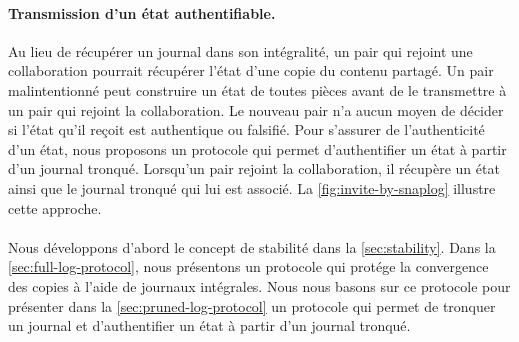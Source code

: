 \paragraph{Transmission d'un état authentifiable.} Au lieu de récupérer un journal dans son intégralité, un pair qui rejoint une collaboration pourrait récupérer l'état d'une copie du contenu partagé.
Un pair malintentionné peut construire un état de toutes pièces avant de le transmettre à un pair qui rejoint la collaboration.
Le nouveau pair n'a aucun moyen de décider si l'état qu'il reçoit est authentique ou falsifié.
Pour s'assurer de l'authenticité d'un état, nous proposons un protocole qui permet d'authentifier un état à partir d'un journal tronqué.
Lorsqu'un pair rejoint la collaboration, il récupère un état ainsi que le journal tronqué qui lui est associé.
La \autoref{fig:invite-by-snaplog} illustre cette approche.

\paragraph{} Nous développons d'abord le concept de stabilité dans la \autoref{sec:stability}.
Dans la \autoref{sec:full-log-protocol}, nous présentons un protocole qui protége la convergence des copies à l'aide de journaux intégrales.
Nous nous basons sur ce protocole pour présenter dans la \autoref{sec:pruned-log-protocol} un protocole qui permet de tronquer un journal et d'authentifier un état à partir d'un journal tronqué.

